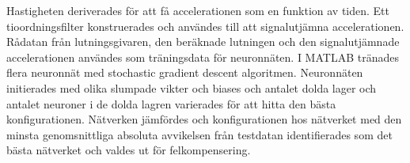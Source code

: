 Hastigheten deriverades för att få accelerationen som en funktion av tiden.
Ett tioordningsfilter konstruerades och användes till att signalutjämna
accelerationen. Rådatan från lutningsgivaren, den beräknade lutningen
och den signalutjämnade accelerationen användes som träningsdata för neuronnäten.
I MATLAB tränades flera neuronnät med stochastic gradient descent algoritmen.
Neuronnäten initierades med olika slumpade vikter och biases och
antalet dolda lager och antalet neuroner i de dolda lagren varierades
för att hitta den bästa konfigurationen.
Nätverken jämfördes och konfigurationen hos nätverket med
den minsta genomsnittliga absoluta avvikelsen från testdatan
identifierades som det bästa nätverket och valdes ut för felkompensering.
